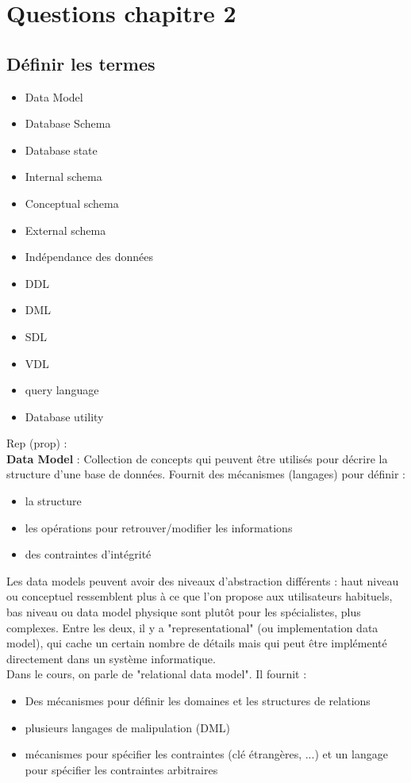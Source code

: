 \section{Questions chapitre 2}

\subsection{Définir les termes}
\begin{itemize}
	\item Data Model
	\item Database Schema
	\item Database state
	\item Internal schema
	\item Conceptual schema
	\item External schema
	\item Indépendance des données
	\item DDL
	\item DML
	\item SDL
	\item VDL
	\item query language
	\item Database utility
\end{itemize}


\noindent
Rep (prop) :\\ 
\textbf{Data Model} : Collection de concepts qui peuvent être 
utilisés pour décrire la structure d'une base de données. 
Fournit des mécanismes (langages) pour définir :
\begin{itemize}
	\item la structure
	\item les opérations pour retrouver/modifier les informations
	\item des contraintes d'intégrité
\end{itemize}
Les data models peuvent avoir 
des niveaux d'abstraction différents : haut niveau ou conceptuel ressemblent 
plus à ce que l'on propose aux utilisateurs habituels, 
bas niveau ou data model physique sont plutôt pour les spécialistes, plus complexes.
Entre les deux, il y a "representational" (ou implementation data model), qui 
cache un certain nombre de détails mais qui peut être implémenté directement dans
un système informatique.\\
Dans le cours, on parle de "relational data model". Il fournit : 
\begin{itemize}
	\item Des mécanismes pour définir les domaines et les structures de relations
	\item plusieurs langages de malipulation (DML)
	\item mécanismes pour spécifier les contraintes (clé étrangères, ...) et un 
	langage pour spécifier les contraintes arbitraires
\end{itemize}

